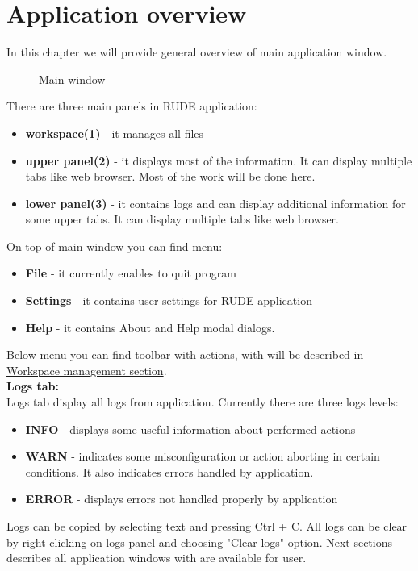 \section{Application overview}\label{section:overview}

In this chapter we will provide general overview of main application window.

\begin{figure*}[!ht] 
	\centering
	\caption{Main window}
\end{figure*}

There are three main panels in RUDE application:
\begin{itemize}
	\item \textbf{workspace(1)} - it manages all files
	\item \textbf{upper panel(2)} - it displays most of the information. It can display multiple tabs like web browser. Most of the work will be done here.
	\item \textbf{lower panel(3)} - it contains logs and can display additional information for some upper tabs. It can display multiple tabs like web browser.
\end{itemize}

On top of main window you can find menu:
\begin{itemize}
	\item \textbf{File} - it currently enables to quit program
	\item \textbf{Settings} - it contains user settings for RUDE application
	\item \textbf{Help} - it contains About and Help modal dialogs.
\end{itemize}

Below menu you can find toolbar with actions, with will be described in \hyperref[section:workspace]{Workspace management section}.\\


\textbf{Logs tab:}\\
Logs tab display all logs from application. 
Currently there are three logs levels:
\begin{itemize}
	\item \textbf{INFO} - displays some useful information about performed actions
	\item \textbf{WARN} - indicates some misconfiguration or action aborting in certain conditions. It also indicates errors handled by application.
	\item \textbf{ERROR} - displays errors not handled properly by application
\end{itemize}

Logs can be copied by selecting text and pressing Ctrl + C. All logs can be clear by right clicking on logs panel and choosing "Clear logs" option.
\newline\newline
Next sections describes all application windows with are available for user.

\vfill\newpage
